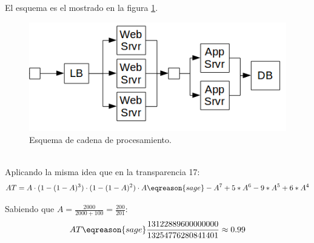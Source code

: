\begin{problem}[7]
\spart
El esquema es el mostrado en la figura \ref{tema3:prob7:esquema}.
\begin{figure}[hbtp]
	\centering
	\includegraphics[keepaspectratio=true,width=\linewidth]{img/tema3_ej7.png}
	\caption{Esquema de cadena de procesamiento.}
	\label{tema3:prob7:esquema}
\end{figure}
$ $\\
\spart
Aplicando la misma idea que en la transparencia 17:
\[ AT = A \cdot (1 - (1 - A)^3) \cdot (1 - (1 - A)^2) \cdot A \eqreason{sage} -A^7 + 5*A^6 - 9*A^5 + 6*A^4 \]

\spart
Sabiendo que $A = \frac{2000}{2000+100} = \frac{200}{201}$:
\[ AT \eqreason{sage} \frac{13122889600000000}{13254776280841401} \approx 0.99 \]
\end{problem}


